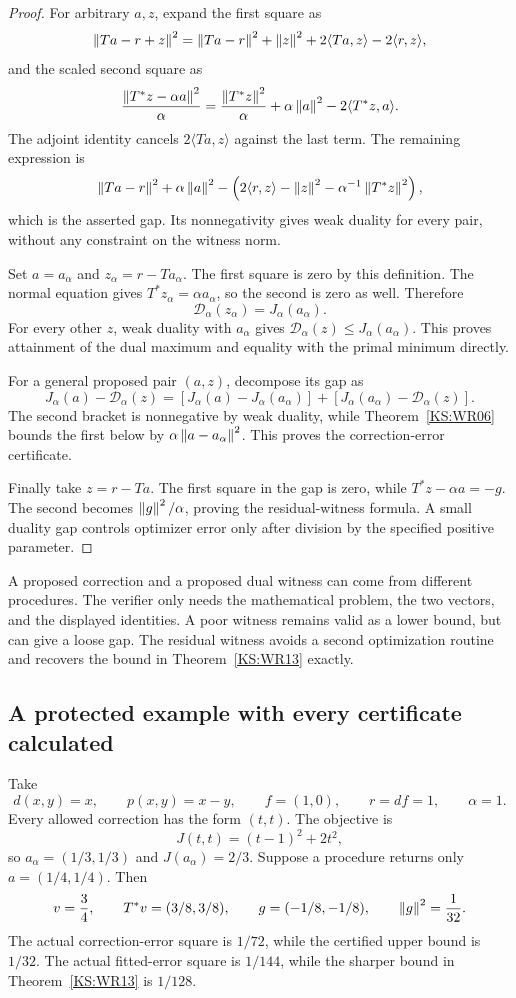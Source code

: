 \begin{proof}
For arbitrary $a,z$, expand the first square as
\[
 \left\lVert Ta-r+z\right\rVert^2
 =\left\lVert Ta-r\right\rVert^2+\left\lVert z\right\rVert^2+2\langle Ta,z\rangle-2\langle r,z\rangle,
\]
and the scaled second square as
\[
 \frac{\left\lVert T^*z-\alpha a\right\rVert^2}{\alpha}
 =\frac{\left\lVert T^*z\right\rVert^2}{\alpha}+\alpha\left\lVert a\right\rVert^2
       -2\langle T^*z,a\rangle.
\]
The adjoint identity cancels $2\langle Ta,z\rangle$ against the last term. The remaining expression is
\[
 \left\lVert Ta-r\right\rVert^2+\alpha\left\lVert a\right\rVert^2
 -\left(2\langle r,z\rangle-\left\lVert z\right\rVert^2
                    -\alpha^{-1}\left\lVert T^*z\right\rVert^2\right),
\]
which is the asserted gap. Its nonnegativity gives weak duality for every pair, without any constraint on the witness norm.

Set $a=a_\alpha$ and $z_\alpha=r-Ta_\alpha$. The first square is zero by this definition. The normal equation gives $T^*z_\alpha=\alpha a_\alpha$, so the second is zero as well. Therefore
\[
 \mathcal D_\alpha(z_\alpha)=J_\alpha(a_\alpha).
\]
For every other $z$, weak duality with $a_\alpha$ gives $\mathcal D_\alpha(z)\le J_\alpha(a_\alpha)$. This proves attainment of the dual maximum and equality with the primal minimum directly.

For a general proposed pair $(a,z)$, decompose its gap as
\[
 J_\alpha(a)-\mathcal D_\alpha(z)
 =[J_\alpha(a)-J_\alpha(a_\alpha)]
  +[J_\alpha(a_\alpha)-\mathcal D_\alpha(z)].
\]
The second bracket is nonnegative by weak duality, while Theorem~\ref{KS:WR06} bounds the first below by $\alpha\left\lVert a-a_\alpha\right\rVert^2$. This proves the correction-error certificate.

Finally take $z=r-Ta$. The first square in the gap is zero, while $T^*z-\alpha a=-g$. The second becomes $\left\lVert g\right\rVert^2/\alpha$, proving the residual-witness formula. A small duality gap controls optimizer error only after division by the specified positive parameter.
\end{proof}

A proposed correction and a proposed dual witness can come from different procedures. The verifier only needs the mathematical problem, the two vectors, and the displayed identities. A poor witness remains valid as a lower bound, but can give a loose gap. The residual witness avoids a second optimization routine and recovers the bound in Theorem~\ref{KS:WR13} exactly.

\subsection{A protected example with every certificate calculated}
Take
\[
 d(x,y)=x,\qquad p(x,y)=x-y,\qquad f=(1,0),\qquad r=df=1,\qquad\alpha=1.
\]
Every allowed correction has the form $(t,t)$. The objective is
\[
 J(t,t)=(t-1)^2+2t^2,
\]
so $a_\alpha=(1/3,1/3)$ and $J(a_\alpha)=2/3$. Suppose a procedure returns only $a=(1/4,1/4)$. Then
\[
 v=\frac34,\qquad T^*v=(3/8,3/8),\qquad
 g=(-1/8,-1/8),\qquad\left\lVert g\right\rVert^2=\frac1{32}.
\]
The actual correction-error square is $1/72$, while the certified upper bound is $1/32$. The actual fitted-error square is $1/144$, while the sharper bound in Theorem~\ref{KS:WR13} is $1/128$.

